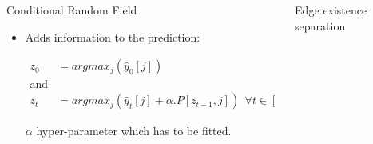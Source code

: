 \documentclass[final]{beamer}
\newlength{\onecolwid}
\newlength{\twocolwid}
\begin{document}
\begin{frame}[t]
\begin{columns}[t]
\begin{column}{\twocolwid}
\begin{columns}[t,totalwidth=\twocolwid]
\begin{column}{\onecolwid}
\begin{block}{Conditional Random Field}
\begin{itemize}
  \vspace{5mm}

  \[
  P[i, j] = Pr(y_{t+1} = y_j | y_{t} =y_i) \textit{ in training set}
  \]

  \vspace{5mm}

  $P$ stochastic matrix of size $(k,k)$.

  \vspace{10mm}

  \item Adds information to the prediction:

  \vspace{5mm}

  \begin{align*}
  z_0 &= argmax_j(\hat{y}_0[j])
  \\
  \text{and}&
  \\
  z_t &= argmax_j(\hat{y}_t[j] + \alpha.P[z_{t-1},  j]) \ \ \forall t \in [1, T]
  \end{align*}

  \vspace{5mm}

  $\alpha$ hyper-parameter which has to be fitted.

  \end{itemize}

\end{block}


\end{column} %

\begin{column}{\onecolwid}\vspace{-.6in} %


\begin{block}{Edge existence separation}


\end{block}


\end{column} %


\end{columns}
\end{column}
\end{columns}
\end{frame}
\end{document}
